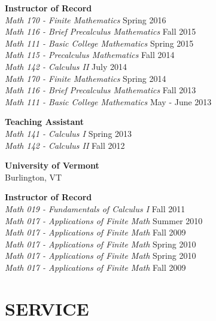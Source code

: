 \documentclass[line,overlapped]{res}
\begin{document}
\begin{resume}
                          {\bf Instructor of Record}\\
                          {\sl Math 170 - Finite Mathematics} \hfill Spring 2016\\
                          {\sl Math 116 - Brief Precalculus Mathematics} \hfill Fall 2015\\
                          {\sl Math 111 - Basic College Mathematics} \hfill Spring 2015\\
                          {\sl Math 115 - Precalculus Mathematics} \hfill Fall 2014\\
                          {\sl Math 142 - Calculus II} \hfill July 2014\\
                          {\sl Math 170 - Finite Mathematics} \hfill Spring 2014\\
                          {\sl Math 116 - Brief Precalculus Mathematics} \hfill Fall 2013\\
                          {\sl Math 111 - Basic College Mathematics} \hfill May - June 2013

                          {\bf Teaching Assistant}\\
                          {\sl Math 141 - Calculus I} \hfill Spring 2013\\
                          {\sl Math 142 - Calculus II} \hfill Fall 2012

                          {\bf University of Vermont}\\Burlington, VT
                          
                          {\bf Instructor of Record}\\
                          {\sl Math 019 - Fundamentals of Calculus I} \hfill Fall 2011\\
                          {\sl Math 017 - Applications of Finite Math} \hfill Summer 2010\\
                          {\sl Math 017 - Applications of Finite Math} \hfill Fall 2009\\
                          {\sl Math 017 - Applications of Finite Math} \hfill Spring 2010\\
                          {\sl Math 017 - Applications of Finite Math} \hfill Spring 2010\\
                          {\sl Math 017 - Applications of Finite Math} \hfill Fall 2009\\
                          \section{SERVICE}


\end{resume}
\end{document}
